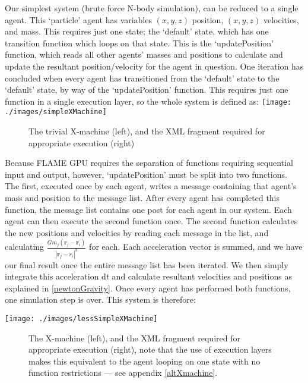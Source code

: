 \documentclass[11pt,a4paper]{article}
\begin{document}
Our simplest system (brute force N-body simulation), can be reduced to a single agent. This `particle' agent has variables $(x,y,z)$ position, $(x,y,z)$ velocities, and mass. This requires just one state; the `default' state, which has one transition function which loops on that state. This is the `updatePosition' function, which reads all other agents' masses and positions to calculate and update the resultant position/velocity for the agent in question. One iteration has concluded when every agent has transitioned from the `default' state to the `default' state, by way of the `updatePosition' function. This requires just one function in a single execution layer, so the whole system is defined as:
\texttt{[image: ./images/simpleXMachine]}
\begin{figure}[h!]
\caption[Brute force N-body X-machine]{The trivial X-machine (left), and the XML fragment required for appropriate execution (right)}
\end{figure}

\noindent Because FLAME GPU requires the separation of functions requiring sequential input and output, however, `updatePosition' must be split into two functions. The first, executed once by each agent, writes a message containing that agent's mass and position to the message list. After every agent has completed this function, the message list contains one post for each agent in our system. Each agent can then execute the second function once. The second function calculates the new positions and velocities by reading each message in the list, and calculating $\frac{Gm_j(\mathbf r_j - \mathbf r_i)}{|\mathbf r_j - r_i|^3}$ for each. Each acceleration vector is summed, and we have our final result once the entire message list has been iterated. We then simply integrate this acceleration $\mathrm{d}t$ and calculate resultant velocities and positions as explained in \ref{newtonGravity}. Once every agent has performed both functions, one simulation step is over. This system is therefore:

\texttt{[image: ./images/lessSimpleXMachine]}
\begin{figure}[h!]
\caption[N-body X-machine with separate I/O]{The X-machine (left), and the XML fragment required for appropriate execution (right), note that the use of execution layers makes this equivalent to the agent looping on one state with no function restrictions --- see appendix \ref{altXmachine}.}
\label{lessSimpleXMachine}
\end{figure}
\end{document}
